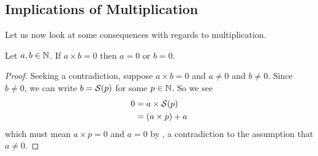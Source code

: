 \subsection{Implications of Multiplication}
Let us now look at some consequences with regards to multiplication.

\begin{proposition}\label{prop:product-that-equals-zero}
    Let $a, b \in \mathbb{N}$. If $a \times b = 0$ then $a = 0$ or $b = 0$.
\end{proposition}
\begin{proof}
    Seeking a contradiction, suppose $a \times b = 0$ and $a \neq 0$ and $b \neq 0$. Since $b \neq 0$, we can write $b = {\mathcal{S}(p)}$ for some $p \in \mathbb{N}$. So we see
    \begin{align*}
        0 &= a \times {\mathcal{S}(p)}\\
        &= (a \times p) + a
    \end{align*}
    which must mean $a \times p = 0$ and $a = 0$ by , a contradiction to the assumption that $a \neq 0$.
\end{proof}

